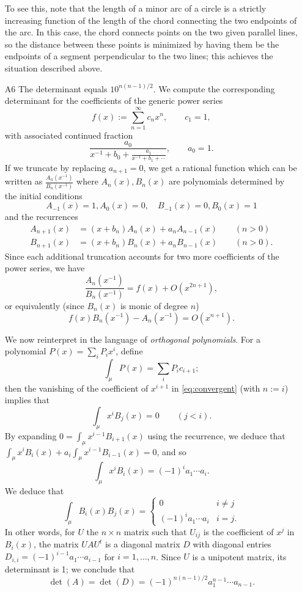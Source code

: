 \documentclass[amssymb,twocolumn,pra,10pt,aps]{revtex4-1}
\begin{document}
\begin{itemize}
To see this, note that the length of a minor arc of a circle is a strictly increasing function of the length of the chord connecting the two endpoints of the arc. In this case, the chord connects points on the two given parallel lines, so the distance between these points is minimized by having them be the endpoints of a segment perpendicular to the two lines; this achieves the situation described above.

\item[A6]
The determinant equals $10^{n(n-1)/2}$.
We compute the corresponding determinant for the coefficients of the generic power series
\[
f(x) := \sum_{n=1}^\infty c_n x^n, \qquad c_1 = 1,
\]
with associated continued fraction
\[
\frac{a_0}{x^{-1} + b_0 + \frac{a_1}{x^{-1} + b_1 + \cdots}}, \qquad a_0 = 1.
\]
If we truncate by replacing $a_{n+1} = 0$, we get a rational function which can be written as $\frac{A_n(x^{-1})}{B_n(x^{-1})}$ where $A_n(x), B_n(x)$ are polynomials determined by the initial conditions
\[
A_{-1}(x) =1, A_0(x) = 0, \quad B_{-1}(x) = 0, B_0(x) = 1
\]
and the recurrences
\begin{align*}
A_{n+1}(x) &= (x + b_{n})A_n(x) + a_{n} A_{n-1}(x) \qquad (n > 0) \\
B_{n+1}(x) &= (x + b_{n})B_n(x) + a_{n} B_{n-1}(x) \qquad (n > 0).
\end{align*}
Since each additional truncation accounts for two more coefficients of the power series, we have
\[
\frac{A_n(x^{-1})}{B_n(x^{-1})} = f(x) + O(x^{2n+1}),
\]
or equivalently (since $B_n(x)$ is monic of degree $n$)
\begin{equation} \label{eq:convergent}
f(x) B_n(x^{-1}) - A_n(x^{-1}) = O(x^{n+1}).
\end{equation}

We now reinterpret in the language of \emph{orthogonal polynomials}.
For a polynomial $P(x) = \sum_i P_i x^i$, define
\[
\int_\mu P(x) = \sum_i P_i c_{i+1};
\]
then the vanishing of the coefficient of $x^{i+1}$
in \eqref{eq:convergent} (with $n := i$) implies that
\[
\int_\mu x^i B_j(x) = 0 \qquad (j < i).
\]
By expanding $0 = \int_\mu x^{i-1} B_{i+1}(x)$ using the recurrence, we deduce that $\int_\mu x^i B_i(x) + a_i \int_\mu x^{i-1} B_{i-1}(x) = 0$, and so
\[
\int_\mu x^i B_i(x) = (-1)^i a_1 \cdots a_i.
\]
We deduce that
\begin{equation} \label{eq:orthogonality}
\int_\mu B_i(x) B_j(x) = \begin{cases} 0 & i \neq j \\
(-1)^i a_1 \cdots a_i & i = j.
\end{cases}
\end{equation}
In other words, for $U$ the $n \times n$ matrix such that
$U_{ij}$ is the coefficient of $x^j$ in $B_i(x)$,
the matrix $UAU^t$ is a diagonal matrix $D$ with diagonal entries
$D_{i,i} = (-1)^{i-1} a_1 \cdots a_{i-1}$ for $i=1,\dots,n$. 
Since $U$ is a unipotent matrix, its determinant is 1; we conclude that
\[
\det(A) = \det(D) = (-1)^{n(n-1)/2} a_1^{n-1} \cdots a_{n-1}.
\]


\end{itemize}
\end{document}
